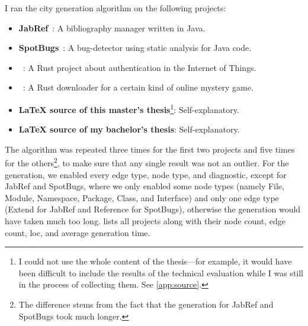 \documentclass[../thesis]{subfiles}
\begin{document}
I ran the city generation algorithm on the following projects:
\begin{itemize}
	\item \textbf{JabRef}~\cite{jabref}: A bibliography manager written in Java.
	\item \textbf{SpotBugs}~\cite{spotbugs}: A bug-detector using static analysis for Java code.
	\item \textbf{}~\cite{dcaf}: A Rust project about authentication in the Internet of Things.
	\item \textbf{}~\cite{aaoffline}: A Rust downloader for a certain kind of online mystery game.
	\item \textbf{\LaTeX{} source of this master's thesis}\footnote{
		      I could not use the whole content of the thesis---for example, it would have been difficult to include the results of the technical evaluation while I was still in the process of collecting them.
		      See \cref{app:source}.
	      }: Self-explanatory.
	\item \textbf{\LaTeX{} source of my bachelor's thesis}: Self-explanatory.
\end{itemize}

The algorithm was repeated three times for the first two projects and five times for the others\footnote{
	The difference stems from the fact that the generation for JabRef and SpotBugs took much longer.
}, to make sure that any single result was not an outlier.
For the generation, we enabled every edge type, node type, and diagnostic, except for JabRef and SpotBugs, where we only enabled some node types (namely File, Module, Namespace, Package, Class, and Interface) and only one edge type (Extend for JabRef and Reference for SpotBugs), otherwise the generation would have taken much too long.
 lists all projects along with their node count, edge count, \gls{loc}, and average generation time.
\end{document}
